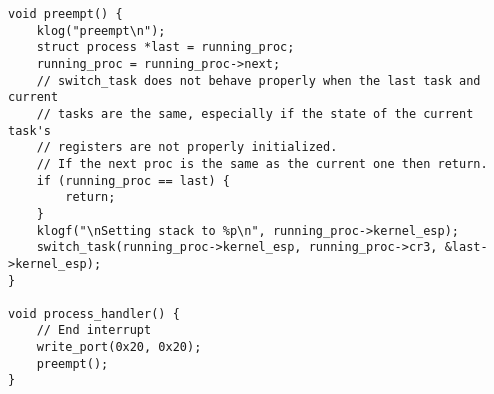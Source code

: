 \documentclass[10pt,conference,draftclsnofoot,onecolumn]{IEEEtran}
\begin{document}
\begin{lstlisting}
void preempt() {
    klog("preempt\n");
    struct process *last = running_proc;
    running_proc = running_proc->next;
    // switch_task does not behave properly when the last task and current
    // tasks are the same, especially if the state of the current task's
    // registers are not properly initialized.
    // If the next proc is the same as the current one then return.
    if (running_proc == last) {
        return;
    }
    klogf("\nSetting stack to %p\n", running_proc->kernel_esp);
    switch_task(running_proc->kernel_esp, running_proc->cr3, &last->kernel_esp);
}

void process_handler() {
    // End interrupt
    write_port(0x20, 0x20);
    preempt();
}
\end{lstlisting}


\clearpage
\printbibliography

\clearpage
\end{document}

